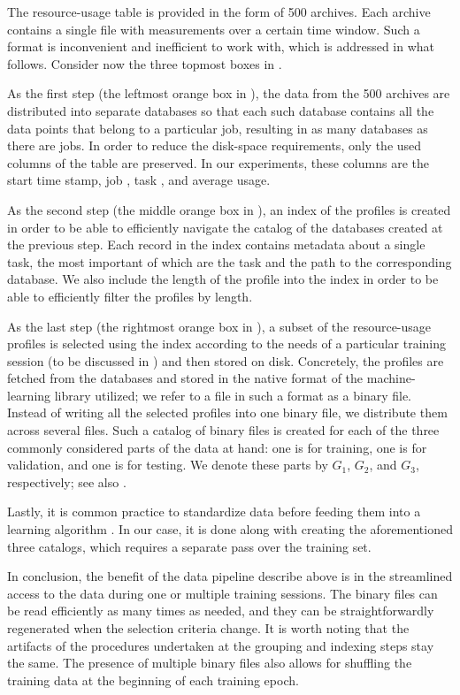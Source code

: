 The resource-usage table is provided in the form of 500 archives. Each archive
contains a single file with measurements over a certain time window. Such a
format is inconvenient and inefficient to work with, which is addressed in what
follows. Consider now the three topmost boxes in .

As the first step (the leftmost orange box in ), the data
from the 500 archives are distributed into separate databases so that each such
database contains all the data points that belong to a particular job, resulting
in as many databases as there are jobs. In order to reduce the disk-space
requirements, only the used columns of the table are preserved. In our
experiments, these columns are the start time stamp, job , task ,
and average  usage.

As the second step (the middle orange box in ), an index
of the profiles is created in order to be able to efficiently navigate the
catalog of the databases created at the previous step. Each record in the index
contains metadata about a single task, the most important of which are the task
 and the path to the corresponding database. We also include the length
of the profile into the index in order to be able to efficiently filter the
profiles by length.

As the last step (the rightmost orange box in ), a subset
of the resource-usage profiles is selected using the index according to the
needs of a particular training session (to be discussed in
) and then stored on disk. Concretely, the profiles are
fetched from the databases and stored in the native format of the
machine-learning library utilized; we refer to a file in such a format as a
binary file. Instead of writing all the selected profiles into one binary file,
we distribute them across several files. Such a catalog of binary files is
created for each of the three commonly considered parts \cite{hastie2013} of the
data at hand: one is for training, one is for validation, and one is for
testing. We denote these parts by $G_1$, $G_2$, and $G_3$, respectively; see
also .

Lastly, it is common practice to standardize data before feeding them into a
learning algorithm \cite{hastie2013}. In our case, it is done along with
creating the aforementioned three catalogs, which requires a separate pass over
the training set.

In conclusion, the benefit of the data pipeline describe above is in the
streamlined access to the data during one or multiple training sessions. The
binary files can be read efficiently as many times as needed, and they can be
straightforwardly regenerated when the selection criteria change. It is worth
noting that the artifacts of the procedures undertaken at the grouping and
indexing steps stay the same. The presence of multiple binary files also allows
for shuffling the training data at the beginning of each training epoch.

